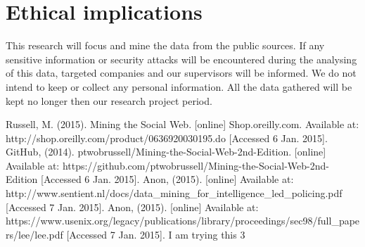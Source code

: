 \documentclass[12pt]{article}
\begin{document}
\section{Ethical implications}

This research will focus and mine the data from the public sources. If any sensitive information or security attacks will be encountered during the analysing of this data, targeted companies and our supervisors will be informed. We do not intend to keep or collect any personal information. All the data gathered will be kept no longer then our research project period. 




\begin{thebibliography}{99}
  Russell, M. (2015). Mining the Social Web. [online] Shop.oreilly.com. Available at: http://shop.oreilly.com/product/0636920030195.do [Accessed 6 Jan. 2015].
  GitHub, (2014). ptwobrussell/Mining-the-Social-Web-2nd-Edition. [online] Available at: https://github.com/ptwobrussell/Mining-the-Social-Web-2nd-Edition [Accessed 6 Jan. 2015].
Anon, (2015). [online] Available at: http://www.sentient.nl/docs/data\_mining\_for\_intelligence\_led\_policing.pdf [Accessed 7 Jan. 2015].
Anon, (2015). [online] Available at: https://www.usenix.org/legacy/publications/library/proceedings/sec98/full\_papers/lee/lee.pdf [Accessed 7 Jan. 2015].
  I am trying this 3
\end{thebibliography}
\end{document}
